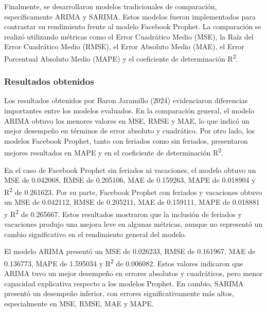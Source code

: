 Finalmente, se desarrollaron modelos tradicionales de comparación, específicamente ARIMA y SARIMA. Estos modelos fueron implementados para contrastar su rendimiento frente al modelo Facebook Prophet. La comparación se realizó utilizando métricas como el Error Cuadrático Medio (MSE), la Raíz del Error Cuadrático Medio (RMSE), el Error Absoluto Medio (MAE), el Error Porcentual Absoluto Medio (MAPE) y el coeficiente de determinación R\textsuperscript{2}.

\subsubsection{Resultados obtenidos}

Los resultados obtenidos por Baron Jaramillo (2024) evidenciaron diferencias importantes entre los modelos evaluados. En la comparación general, el modelo ARIMA obtuvo los menores valores en MSE, RMSE y MAE, lo que indicó un mejor desempeño en términos de error absoluto y cuadrático. Por otro lado, los modelos Facebook Prophet, tanto con feriados como sin feriados, presentaron mejores resultados en MAPE y en el coeficiente de determinación R\textsuperscript{2}.

En el caso de Facebook Prophet sin feriados ni vacaciones, el modelo obtuvo un MSE de 0.042068, RMSE de 0.205106, MAE de 0.159263, MAPE de 0.018904 y R\textsuperscript{2} de 0.261623. Por su parte, Facebook Prophet con feriados y vacaciones obtuvo un MSE de 0.042112, RMSE de 0.205211, MAE de 0.159111, MAPE de 0.018881 y R\textsuperscript{2} de 0.265667. Estos resultados mostraron que la inclusión de feriados y vacaciones produjo una mejora leve en algunas métricas, aunque no representó un cambio significativo en el rendimiento general del modelo.

El modelo ARIMA presentó un MSE de 0.026233, RMSE de 0.161967, MAE de 0.136773, MAPE de 1.595034 y R\textsuperscript{2} de 0.006082. Estos valores indicaron que ARIMA tuvo un mejor desempeño en errores absolutos y cuadráticos, pero menor capacidad explicativa respecto a los modelos Prophet. En cambio, SARIMA presentó un desempeño inferior, con errores significativamente más altos, especialmente en MSE, RMSE, MAE y MAPE.

